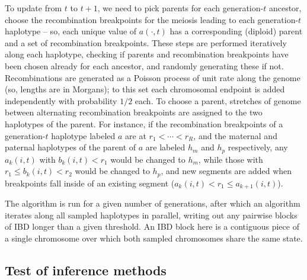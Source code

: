 \documentclass{article}
\begin{document}
To update from $t$ to $t+1$, we need to pick parents for each generation-$t$ ancestor,
choose the recombination breakpoints for the meiosis leading to each generation-$t$ haplotype
-- so, each unique value of $a(\cdot,t)$ has a corresponding (diploid) parent and a set of recombination breakpoints.
These steps are performed iteratively along each haplotype,
checking if parents and recombination breakpoints have been chosen already for each ancestor,
and randomly generating these if not.
Recombinations are generated as a Poisson process of unit rate along the genome (so, lengths are in Morgans);
to this set each chromosomal endpoint is added independently with probability $1/2$ each.
To choose a parent, 
stretches of genome between alternating recombination breakpoints are assigned to the two haplotypes of the parent.
For instance, if the recombination breakpoints of a generation-$t$ haplotype labeled $a$ are at $r_1 < \cdots < r_R$,
and the maternal and paternal haplotypes of the parent of $a$ are labeled $h_m$ and $h_p$ respectively,
any $a_k(i,t)$ with $b_k(i,t)<r_1$ would be changed to $h_m$, while those with $r_1 \le b_k(i,t)<r_2$ would be changed to $h_p$,
and new segments are added when breakpoints fall inside of an existing segment ($a_k(i,t)<r_1\le a_{k+1}(i,t)$).

The algorithm is run for a given number of generations, 
after which an algorithm iterates along all sampled haplotypes in parallel, 
writing out any pairwise blocks of IBD longer than a given threshold.
An IBD block here is a contiguous piece of a single chromosome
over which both sampled chromosomes share the same state.


\subsection{Test of inference methods}
\end{document}
